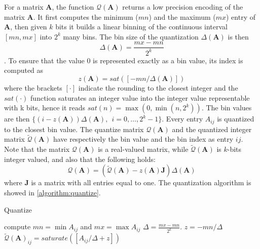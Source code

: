  For a matrix $\mathbf{A}$, the function $\mathcal{Q}(\mathbf{A})$ returns a low precision encoding of the matrix $\mathbf{A}$. It first computes the minimum ($mn$) and the maximum ($mx$) entry of $\mathbf{A}$, then given $k$ bits it builds a linear binning of the continuous interval $[mn,mx]$ into $2^k$ many bins. The bin size of the quantization $\Delta(\mathbf{A})$ is then \[\Delta(\mathbf{A}) = \frac{mx - mn}{2^k}\]. To ensure that the value $0$ is represented exactly as a bin value, its index is computed as \[z(\mathbf{A}) = sat([-mn/\Delta(\mathbf{A})])\] where the brackets $[\cdot]$ indicate the rounding to the closest integer and the $sat(\cdot)$ function saturates an integer value into the integer value representable with k bits, hence it reads $sat(n) = \max(0, \min(n,2^k) )$. The bin values are then $\{ (i-z(\mathbf{A})) \Delta(\mathbf{A}), \ \ i = 0, \dots, 2^k -1 \}$. Every entry $A_{ij}$ is quantized to the closest bin value. The quantize matrix  $\mathcal{Q}(\mathbf{A})$ and the quantized integer matrix $\tilde{\mathcal{Q}}(\mathbf{A})$ have respectively the bin value and the bin index as entry $ij$. Note that the matrix $\mathcal{Q}(\mathbf{A})$ is a real-valued matrix, while $\tilde{\mathcal{Q}}(\mathbf{A})$ is $k$-bits integer valued, and also that the following holds:
\begin{equation}\label{equation:affine_transf}
\mathcal{Q}(\mathbf{A}) = (\tilde{\mathcal{Q}}(\mathbf{A}) -z(\mathbf{A}) \mathbf{J}  ) \Delta(\mathbf{A})
\end{equation} 
where $\mathbf{J}$ is a matrix with all entries equal to one. The quantization algorithm is showed in \cref{algorithm:quantize}.

\begin{algorithm}
	\caption{Quantize}\label{algorithm:quantize}
	\begin{algorithmic}[1]
		\State compute $mn = \min A_{ij}$ and $mx = \max A_{ij}$
		\State $\Delta = \frac{mx - mn}{2^k}$.
		\State $z = -mn/\Delta$
			\State $\tilde{\mathcal{Q}}(\mathbf{A})_{ij} = saturate([A_{ij}/\Delta + z ])$ 
		\EndFor
	\end{algorithmic}
\end{algorithm}

